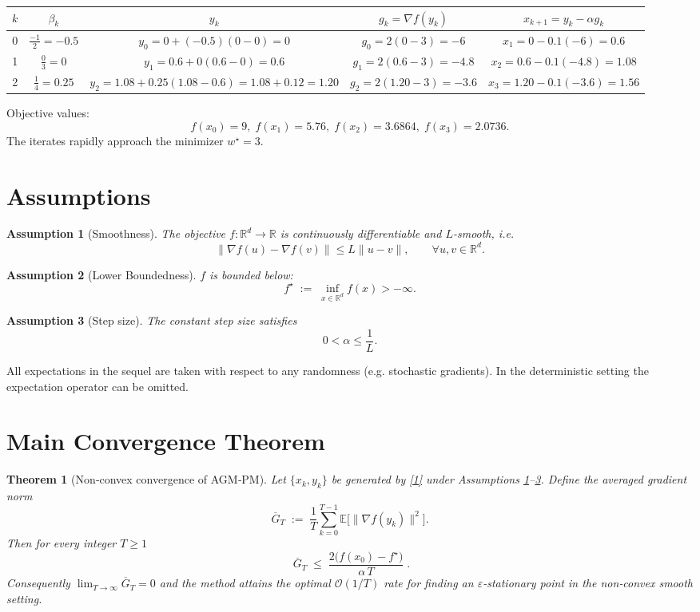 \documentclass{article}
\newtheorem{theorem}{Theorem}
\newtheorem{assumption}{Assumption}
\begin{document}
\begin{center}
\begin{tabular}{c|c|c|c|c}
\(k\) & \(\beta_k\) & \(y_k\) & \(g_k=\nabla f(y_k)\) & \(x_{k+1}=y_k-\alpha g_k\)\\\hline
0 & \(\displaystyle\frac{-1}{2}= -0.5\) & \(y_0 =0+(-0.5)(0-0)=0\) &
\(g_0=2(0-3)=-6\) &
\(x_1 =0-0.1(-6)=0.6\)\\[4pt]
1 & \(\displaystyle\frac{0}{3}=0\) & \(y_1 =0.6+0(0.6-0)=0.6\) &
\(g_1=2(0.6-3)=-4.8\) &
\(x_2 =0.6-0.1(-4.8)=1.08\)\\[4pt]
2 & \(\displaystyle\frac{1}{4}=0.25\) &
\(y_2 =1.08+0.25(1.08-0.6)=1.08+0.12=1.20\) &
\(g_2=2(1.20-3)=-3.6\) &
\(x_3 =1.20-0.1(-3.6)=1.56\)
\end{tabular}
\end{center}

Objective values:
\[
f(x_0)=9,\; f(x_1)=5.76,\; f(x_2)=3.6864,\; f(x_3)=2.0736.
\]
The iterates rapidly approach the minimizer \(w^\star=3\).

\newpage
\section*{Assumptions}
\begin{assumption}[Smoothness]\label{ass:smooth}
The objective \(f:\mathbb{R}^{d}\to\mathbb{R}\) is continuously differentiable and
\(L\)-smooth, i.e.
\[
\|\nabla f(u)-\nabla f(v)\|\le L\|u-v\|,\qquad\forall u,v\in\mathbb{R}^{d}.
\tag{A1}
\]
\end{assumption}
\begin{assumption}[Lower Boundedness]\label{ass:lb}
\(f\) is bounded below:
\[
f^\star \;:=\; \inf_{x\in\mathbb{R}^{d}} f(x) > -\infty .
\tag{A2}
\]
\end{assumption}
\begin{assumption}[Step size]\label{ass:stepsize}
The constant step size satisfies
\[
0<\alpha\le \frac{1}{L}.
\tag{A3}
\]
\end{assumption}
All expectations in the sequel are taken with respect to any randomness
(e.g. stochastic gradients). In the deterministic setting the expectation
operator can be omitted.

\section*{Main Convergence Theorem}
\begin{theorem}[Non‑convex convergence of AGM‑PM]\label{thm:main}
Let \(\{x_k,y_k\}\) be generated by \eqref{1} under Assumptions
\ref{ass:smooth}–\ref{ass:stepsize}. Define the averaged gradient
norm
\[
\overline{G}_T \;:=\; \frac{1}{T}\sum_{k=0}^{T-1}
\mathbb{E}\bigl[\|\nabla f(y_k)\|^{2}\bigr].
\]
Then for every integer \(T\ge 1\)
\[
\boxed{\;
\overline{G}_T \;\le\;
\frac{2\bigl(f(x_0)-f^\star\bigr)}{\alpha\,T}\; }.
\tag{2}
\]
Consequently \(\displaystyle\lim_{T\to\infty}\overline{G}_T=0\) and the
method attains the optimal \(\mathcal{O}(1/T)\) rate for finding an
\(\varepsilon\)-stationary point in the non‑convex smooth setting.
\end{theorem}
\end{document}
